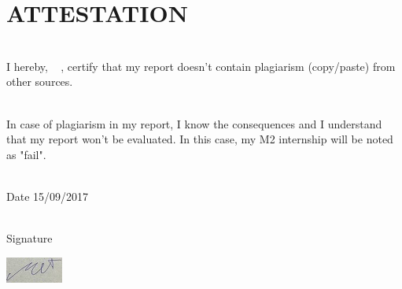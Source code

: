 \chapter*{ATTESTATION}



\vfill


\noindent\hrulefill

~\\


I hereby,  \FirstName~  \LastName, certify that my report doesn't contain plagiarism (copy/paste) from other sources.

~\\

In case of plagiarism in my report, I know the consequences and I understand that my report won't be evaluated. In this case, my M2 internship will be noted as "fail".


~\\

 Date 15/09/2017 

~\\
 
 Signature
 \vspace{0.5cm}
 
 \includegraphics{signature.jpg}
 
 \
 
 \FirstName~  \LastName
 

~\\
~\\
~\\
~\\
~\\

\noindent\hrulefill


\vfill


\vfill



%
%
%
%
%
%
%
%
%
% 
% 
%
% 
%
%
%
%
%
